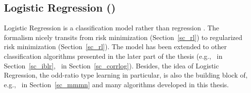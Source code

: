 {\fi




%
% 
\subsection{Logistic Regression (\lr)}\label{sc_lr}

Logistic Regression is a classification model rather than regression \citep{Bishop07}.
The formalism nicely transits from risk minimization (Section~\ref{sc_rl}) to regularized risk minimization (Section~\ref{sc_rl}).
The model has been extended to other classification algorithms presented in the later part of the thesis (e.g., \iblr\ in Section~\ref{sc_iblr}, \corrlog\ in Section~\ref{sc_corrlog}).
Besides, the idea of Logistic Regression, the odd-ratio type learning in particular, is also the building block of, e.g., \mmmn\ in Section~\ref{sc_mmmn} and many algorithms developed in this thesis.

}
